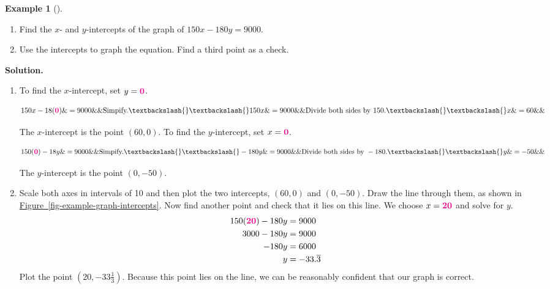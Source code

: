 \documentclass[10pt,]{book}
\theoremstyle{plain}
\theoremstyle{definition}
\theoremstyle{definition}
\newtheorem{example}[theorem]{Example}
\theoremstyle{definition}
\numberwithin{equation}{part}
\newcommand{\alert}[1]{\boldsymbol{\color{magenta}{#1}}}
\newcommand{\amp}{&}
\begin{document}
\begin{example}[]\label{intercepts}
\leavevmode%
\begin{enumerate}[label=\alph*]
\item\hypertarget{li-63}{}Find the \(x\)- and \(y\)-intercepts of the graph of \(150x - 180y = 9000\).%
\item\hypertarget{li-64}{}Use the intercepts to graph the equation. Find a third point as a check.%
\end{enumerate}
\par\medskip\noindent%
\textbf{Solution.}\quad \leavevmode%
\begin{enumerate}[label=\alph*]
\item\hypertarget{li-65}{}To find the \(x\)-intercept, set \(y = \alert{0}\).%
\par
\begin{align*} 150x-18(\alert{0})\&=9000 \&\&\text{Simpify.}\textbackslash{}\textbackslash{} 150x\&=9000  \&\&\text{Divide both sides by 150.}\textbackslash{}\textbackslash{} x\&=60   \&\& \end{align*}%
\par
The \(x\)-intercept is the point \((60, 0)\). To find the \(y\)-intercept, set \(x = \alert{0}\).%
\par
\begin{align*} 150(\alert{0})-18y\&=9000 \&\&\text{Simpify.}\textbackslash{}\textbackslash{} -180y\&=9000  \&\&\text{Divide both sides by } -180\text{.}\textbackslash{}\textbackslash{} y\&=-50   \&\& \end{align*}%
\par
The \(y\)-intercept is the point \((0, -50)\).%
\item\hypertarget{li-66}{}Scale both axes in intervals of 10 and then plot the two intercepts, \((60, 0)\) and \((0, -50)\). Draw the line through them, as shown in \hyperref[fig-example-graph-intercepts]{Figure~\ref{fig-example-graph-intercepts}}. Now find another point and check that it lies on this line. We choose \(x = \alert{20}\) and solve for \(y\).%
\begin{align*}
150(\alert{20}) -180y \amp = 9000\\
3000 -180y \amp = 9000\\
-180y \amp = 6000\\
y \amp =-33.\overline{3}
\end{align*}
Plot the point \((20, -33\frac{1}{3})\). Because this point lies on the line, we can be reasonably confident that our graph is correct. \begin{figure}

\end{figure}
\end{enumerate}
\end{example}
\end{document}
